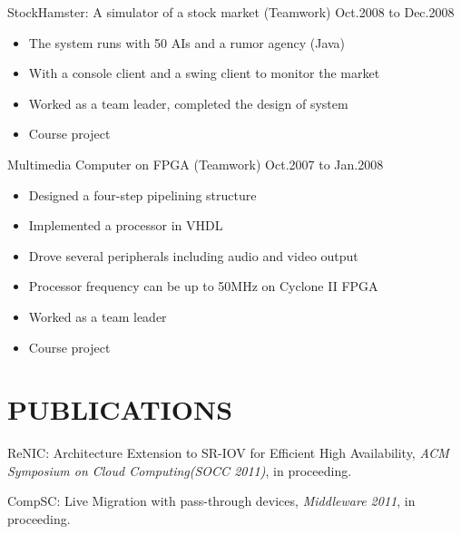 \documentclass[11pt]{res} %
\begin{document}
\begin{resume}
StockHamster: A simulator of a stock market (Teamwork) \hfill Oct.2008 to Dec.2008

\begin{itemize} \itemsep -2pt
\item The system runs with 50 AIs and a rumor agency (Java)
\item With a console client and a swing client to monitor the market
\item Worked as a team leader, completed the design of system
\item Course project
\end{itemize}

Multimedia Computer on FPGA (Teamwork) \hfill Oct.2007 to Jan.2008

\begin{itemize} \itemsep -2pt
\item Designed a four-step pipelining structure
\item Implemented a processor in VHDL
\item Drove several peripherals including audio and video output
\item Processor frequency can be up to 50MHz on Cyclone II FPGA
\item Worked as a team leader
\item Course project
\end{itemize}



\section{PUBLICATIONS}
ReNIC: Architecture Extension to SR-IOV for Efficient High
Availability, \emph{ACM Symposium on Cloud Computing(SOCC 2011)}, in
proceeding.

CompSC: Live Migration with pass-through devices, \emph{Middleware 2011}, in proceeding.


\end{resume}
\end{document}
